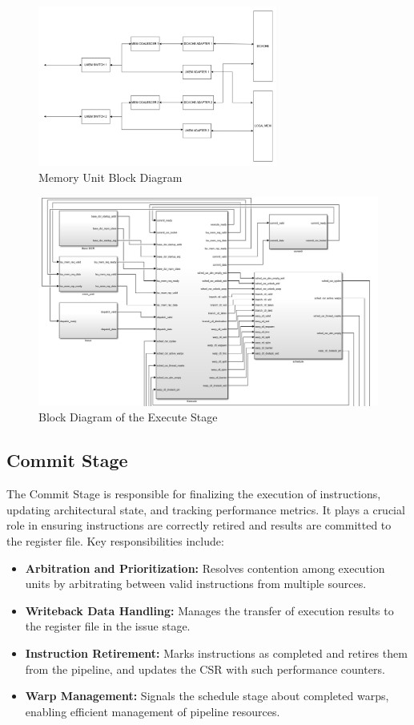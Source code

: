 \documentclass[12pt]{report}
\begin{document}
\begin{figure}[H]
    \centering
    \includegraphics[width=0.7\textwidth]{./figures/mem_unit.png}
    \caption{Memory Unit Block Diagram}
\end{figure}

\begin{figure}[H]
    \centering
    \includegraphics[width=1\textwidth]{./figures/execute.png}
    \caption{Block Diagram of the Execute Stage}
\end{figure}

\subsection{Commit Stage}

The Commit Stage is responsible for finalizing the execution of instructions, updating architectural state, and tracking performance metrics. It plays a crucial role in ensuring instructions are correctly retired and results are committed to the register file. Key responsibilities include:
\begin{itemize}
    \item \textbf{Arbitration and Prioritization:} Resolves contention among execution units by arbitrating between valid instructions from multiple sources.
    \item \textbf{Writeback Data Handling:} Manages the transfer of execution results to the register file in the issue stage.
    \item \textbf{Instruction Retirement:} Marks instructions as completed and retires them from the pipeline, and updates the CSR with such performance counters.
    \item \textbf{Warp Management:} Signals the schedule stage about completed warps, enabling efficient management of pipeline resources.
\end{itemize}
\end{document}
